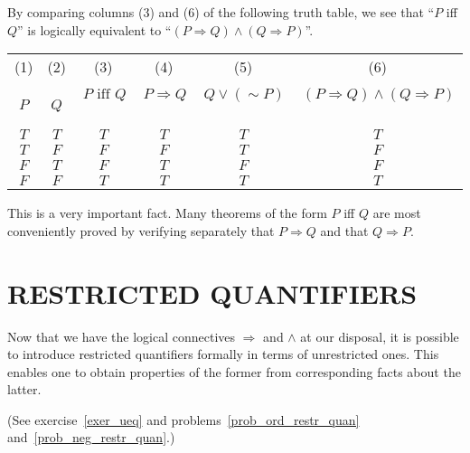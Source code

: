 \begin{exam} By comparing columns (3) and (6) of the following truth table, we see that
``$P$ iff $Q$'' is logically equivalent to ``$(P \Rightarrow Q) \land (Q \Rightarrow P)$''.
 \begin{center}
  \begin{tabular}{|c|c||c|c|c|c|}\hline
           (1)  &   (2)   &       (3)              &      (4)              &      (5)              &                      (6)                        \\
        \,$P$\, & \,$Q$\, & \,$P \text{ iff } Q$\, & \,$P \Rightarrow Q$\, & \,$Q \lor (\sim P)$\, & \,$(P \Rightarrow Q) \land (Q \Rightarrow P)$\, \\
    \hline\hline
          $T$   &   $T$   &       $T$              &      $T$              &       $T$             &                       $T$                       \\
    \hline
          $T$   &   $F$   &       $F$              &      $F$              &       $T$             &                       $F$                       \\
    \hline
          $F$   &   $T$   &       $F$              &      $T$              &       $F$             &                       $F$                       \\
    \hline
          $F$   &   $F$   &       $T$              &      $T$              &       $T$             &                       $T$                       \\
    \hline
  \end{tabular}
 \end{center}
This is a very important fact. Many theorems of the form $P$ iff $Q$ are most conveniently
proved by verifying separately that $P \Rightarrow Q$ and that $Q \Rightarrow P$.
\end{exam}






\section{RESTRICTED QUANTIFIERS}\label{restr_quan}  Now that we have the logical connectives
$\Rightarrow$ and $\land$ at our disposal, it is possible to introduce restricted quantifiers
formally in terms of unrestricted ones. This enables one to obtain properties of the former
from corresponding facts about the latter.

(See exercise~\ref{exer_ueq} and problems~\ref{prob_ord_restr_quan}
and~\ref{prob_neg_restr_quan}.)


